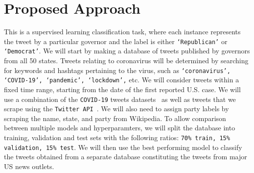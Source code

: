 \section*{Proposed Approach}


This is a supervised learning classification task, where each instance represents the tweet
by a particular governor and the label is either \texttt{‘Republican’} or \texttt{‘Democrat’}. 
We will start by making a database of tweets published by governors from all 50 states. 
Tweets relating to coronavirus will be determined by searching for keywords and hashtags pertaining to the virus, such as
\texttt{‘coronavirus’, ‘COVID-19’, ‘pandemic’, ‘lockdown’,} etc. We will consider tweets within a fixed
time range, starting from the date of the first reported U.S. case. We will use a combination of
the \texttt{COVID-19} tweets datasets~\cite{781w-ef42-20, kaggle} as well as tweets that we scrape using the \texttt{Twitter API}~\cite{api}.
We will also need to assign party labels by scraping the name, state, and party from Wikipedia.
To allow comparison between multiple models and hyperparamters, we will split the database into training, validation and test sets with the following ratios: \texttt{70\% train, 15\% validation, 15\% test}. We will then use the best performing model to classify the tweets obtained from a separate database constituting the tweets from major US news outlets. 




